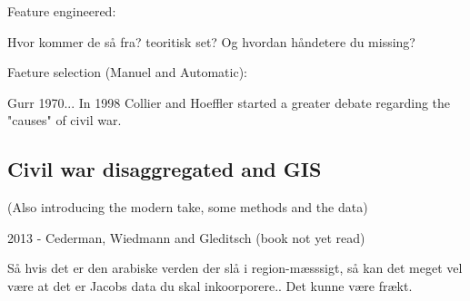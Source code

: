 

Feature engineered:


Hvor kommer de så fra? teoritisk set?    
Og hvordan håndetere du missing?

Faeture selection (Manuel and Automatic):






Gurr 1970... In 1998 Collier and Hoeffler started a greater debate regarding the "causes" of civil war.


\subsection{Civil war disaggregated and GIS}

(Also introducing the modern take, some methods and the data)

2013 - Cederman, Wiedmann and Gleditsch (book not yet read)

Så hvis det er den arabiske verden der slå i region-mæsssigt, så kan det meget vel være at det er Jacobs data du skal inkoorporere.. Det kunne være frækt.


